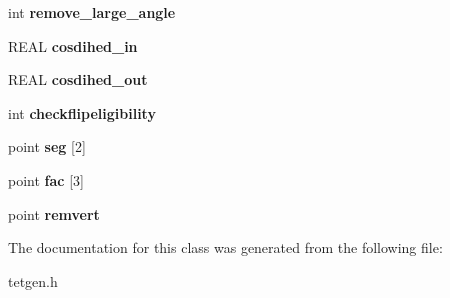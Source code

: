 \begin{DoxyCompactItemize}
\item 
\mbox{\label{classtetgenmesh_1_1flipconstraints_abc7659ab61a966b1a47560fd07a58ccb}} 
int {\bfseries remove\+\_\+large\+\_\+angle}
\item 
\mbox{\label{classtetgenmesh_1_1flipconstraints_a04bbb705181108809fa35a24fd2b32b0}} 
R\+E\+AL {\bfseries cosdihed\+\_\+in}
\item 
\mbox{\label{classtetgenmesh_1_1flipconstraints_a546d64ebfd4f8bb01b5f4f56dde43a07}} 
R\+E\+AL {\bfseries cosdihed\+\_\+out}
\item 
\mbox{\label{classtetgenmesh_1_1flipconstraints_a4eb3f0e12749cae8b73f0f80e6f7748c}} 
int {\bfseries checkflipeligibility}
\item 
\mbox{\label{classtetgenmesh_1_1flipconstraints_a65862c9f061693a1961f96f3f471c95e}} 
point {\bfseries seg} \mbox{[}2\mbox{]}
\item 
\mbox{\label{classtetgenmesh_1_1flipconstraints_a99946dec792882c06d7608bb9967e5bb}} 
point {\bfseries fac} \mbox{[}3\mbox{]}
\item 
\mbox{\label{classtetgenmesh_1_1flipconstraints_a1a6025cc57533d98fef46ffbdcbbc83f}} 
point {\bfseries remvert}
\end{DoxyCompactItemize}


The documentation for this class was generated from the following file\+:\begin{DoxyCompactItemize}
\item 
tetgen.\+h\end{DoxyCompactItemize}
